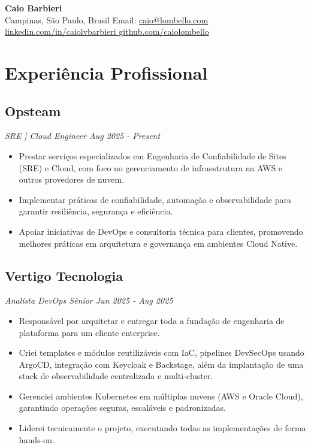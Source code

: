 \documentclass[a4paper,10pt]{article}
\begin{document}
\begin{center}
{\LARGE \textbf{ Caio Barbieri }}
\\ [0.1cm]
Campinas, São Paulo, Brasil
{\textbullet}
Email: \href{mailto:caio@lombello.com }{ caio@lombello.com }
{\textbullet}
\href{ https://linkedin.com/in/caiolvbarbieri }{linkedin.com/in/caiolvbarbieri }
{\textbullet}
\href{ https://github.com/caiolombello }{github.com/caiolombello }
\end{center}


\section{ Experiência Profissional }
\subsection*{\texorpdfstring{
\textbf{ Opsteam } \hfill 
}{
Opsteam -- 
}}
\textit{ SRE | Cloud Engineer \hfill Aug 2025 - Present }
\begin{itemize}
\item Prestar serviços especializados em Engenharia de Confiabilidade de Sites (SRE) e Cloud, com foco no gerenciamento de infraestrutura na AWS e outros provedores de nuvem.
\item Implementar práticas de confiabilidade, automação e observabilidade para garantir resiliência, segurança e eficiência.
\item Apoiar iniciativas de DevOps e consultoria técnica para clientes, promovendo melhores práticas em arquitetura e governança em ambientes Cloud Native.
\end{itemize}
\subsection*{\texorpdfstring{
\textbf{ Vertigo Tecnologia } \hfill 
}{
Vertigo Tecnologia -- 
}}
\textit{ Analista DevOps Sênior \hfill Jun 2025 - Aug 2025 }
\begin{itemize}
\item Responsável por arquitetar e entregar toda a fundação de engenharia de plataforma para um cliente enterprise.
\item Criei templates e módulos reutilizáveis com IaC, pipelines DevSecOps usando ArgoCD, integração com Keycloak e Backstage, além da implantação de uma stack de observabilidade centralizada e multi-cluster.
\item Gerenciei ambientes Kubernetes em múltiplas nuvens (AWS e Oracle Cloud), garantindo operações seguras, escaláveis e padronizadas.
\item Liderei tecnicamente o projeto, executando todas as implementações de forma hands-on.
\end{itemize}
\end{document}
